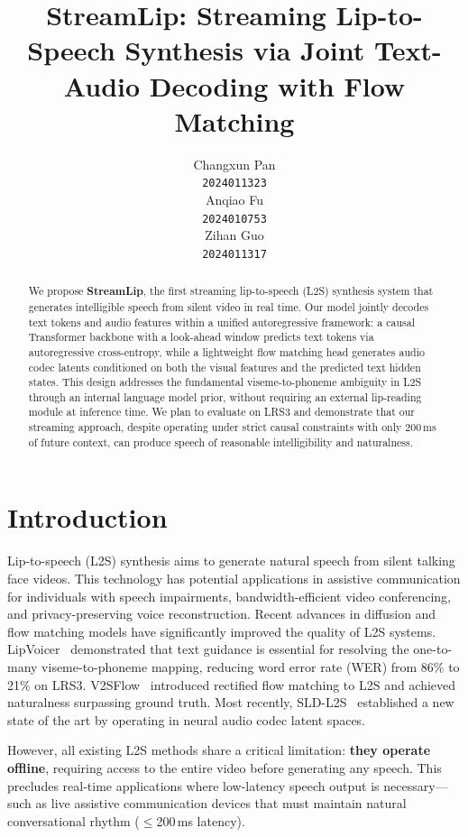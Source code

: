 \documentclass{article}
\title{StreamLip: Streaming Lip-to-Speech Synthesis via Joint Text-Audio Decoding with Flow Matching}
\author{%
  Changxun Pan \\
  \texttt{2024011323} \\
  \And
  Anqiao Fu \\
  \texttt{2024010753} \\
  \And
  Zihan Guo \\
  \texttt{2024011317} \\
}
\begin{document}
\maketitle

\begin{abstract}
We propose \textbf{StreamLip}, the first streaming lip-to-speech (L2S) synthesis system that generates intelligible speech from silent video in real time. Our model jointly decodes text tokens and audio features within a unified autoregressive framework: a causal Transformer backbone with a look-ahead window predicts text tokens via autoregressive cross-entropy, while a lightweight flow matching head generates audio codec latents conditioned on both the visual features and the predicted text hidden states. This design addresses the fundamental viseme-to-phoneme ambiguity in L2S through an internal language model prior, without requiring an external lip-reading module at inference time. We plan to evaluate on LRS3 and demonstrate that our streaming approach, despite operating under strict causal constraints with only 200\,ms of future context, can produce speech of reasonable intelligibility and naturalness.
\end{abstract}

\section{Introduction}

Lip-to-speech (L2S) synthesis aims to generate natural speech from silent talking face videos. This technology has potential applications in assistive communication for individuals with speech impairments, bandwidth-efficient video conferencing, and privacy-preserving voice reconstruction. Recent advances in diffusion and flow matching models have significantly improved the quality of L2S systems. LipVoicer~\cite{lipvoicer} demonstrated that text guidance is essential for resolving the one-to-many viseme-to-phoneme mapping, reducing word error rate (WER) from 86\% to 21\% on LRS3. V2SFlow~\cite{v2sflow} introduced rectified flow matching to L2S and achieved naturalness surpassing ground truth. Most recently, SLD-L2S~\cite{sldl2s} established a new state of the art by operating in neural audio codec latent spaces.

However, all existing L2S methods share a critical limitation: \textbf{they operate offline}, requiring access to the entire video before generating any speech. This precludes real-time applications where low-latency speech output is necessary---such as live assistive communication devices that must maintain natural conversational rhythm ($\leq$200\,ms latency).
\end{document}
